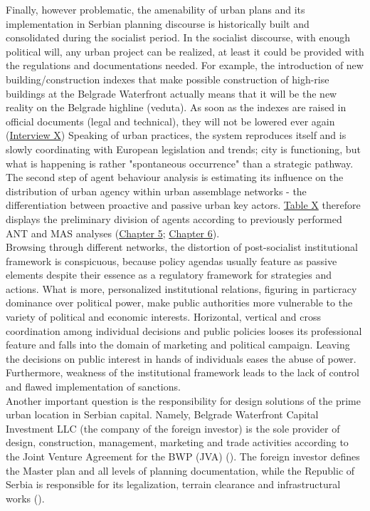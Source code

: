 \documentclass[11pt]{report}
\begin{document}
Finally, however problematic, the amenability of urban plans and its implementation in Serbian planning discourse is historically built and consolidated during the socialist period.
In the socialist discourse, with enough political will, any urban project can be realized, at least it could be provided with the regulations and documentations needed.
For example, the introduction of new building/construction indexes that make possible construction of high-rise buildings at the Belgrade Waterfront actually means that it will be the new reality on the Belgrade highline (veduta).
As soon as the indexes are raised in official documents (legal and technical), they will not be lowered ever again
(\href{InterviewX}{Interview X})
Speaking of urban practices, the system reproduces itself and is slowly coordinating with European legislation and trends; city is functioning, but what is happening is rather "spontaneous occurrence" than a strategic pathway.
\\

The second step of agent behaviour analysis is estimating its influence on the distribution of urban agency within urban assemblage networks - the differentiation between proactive and passive urban key actors.
\href{TableX}{Table X} therefore displays the preliminary division of agents according to previously performed ANT and MAS analyses (\href{Chapter 5}{Chapter 5}; \href{Chapter 6}{Chapter 6}).
\\

Browsing through different networks, the distortion of post-socialist institutional framework is conspicuous, because policy agendas usually feature as passive elements despite their essence as a regulatory framework for strategies and actions.
What is more, personalized institutional relations, figuring in particracy dominance over political power, make public authorities more vulnerable to the variety of political and economic interests.
Horizontal, vertical and cross coordination among individual decisions and public policies looses its professional feature and falls into the domain of marketing and political campaign.
Leaving the decisions on public interest in hands of individuals eases the abuse of power.
Furthermore, weakness of the institutional framework leads to the lack of control and flawed implementation of sanctions. 
\\

Another important question is the responsibility for design solutions of the prime urban location in Serbian capital.
Namely, Belgrade Waterfront Capital Investment LLC (the company of the foreign investor) is the sole provider of design, construction, management, marketing and trade activities according to the Joint Venture Agreement for the BWP (JVA) (\href{NDVBGD}{\cite{NDVBGD analiza ugovora dokument????}}).
The foreign investor defines the Master plan and all levels of planning documentation, while the Republic of Serbia is responsible for its legalization, terrain clearance and infrastructural works (\href{JVA}{\cite{JVA2015}}).
\\
\end{document}

